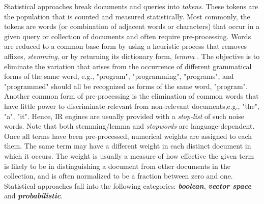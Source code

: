 Statistical approaches break documents and queries into \textit{tokens}. These tokens are the population that is counted and measured statistically. Most commonly, the tokens are words (or combination of adjacent words or characters) that occur in a given query or collection of documents and often require pre-processing. Words are reduced to a common base form by using a heuristic process that removes affixes, \textit{stemming}, or by returning its dictionary form, \textit{lemma} \citep{porter1997}. The objective is to eliminate the variation that arises from the occurrence of different grammatical  forms  of  the  same  word,  e.g.,  "program",  "programming",  "programs", and "programmed" should all be recognized as forms of the same word, "program". Another common form of pre-processing is the elimination of common words that have little power to discriminate relevant from non-relevant documents,e.g., "the", "a", "it". Hence, IR engines are usually provided with a \textit{stop-list} of such noise words. Note that both stemming/lemma and \textit{stopwords} are language-dependent. Once all terms have been pre-processed, numerical weights are assigned to each them. The same term may have a different weight in each distinct document in which it occurs. The weight is usually a measure of how effective the given term is likely to be in distinguishing a document from other documents in the collection, and is often normalized to be a fraction between zero and one. Statistical approaches fall into the following categories: \textbf{\textit{boolean}}, \textbf{\textit{vector space}} and \textbf{\textit{probabilistic}}.

